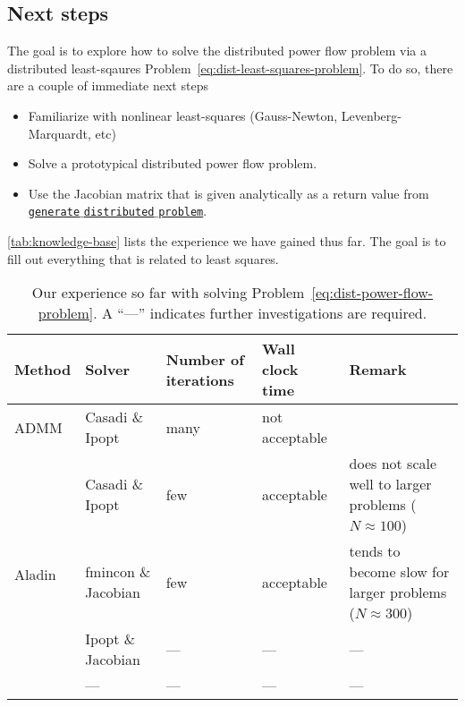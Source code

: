 \documentclass{article}
\begin{document}
\subsection{Next steps}

The goal is to explore how to solve the distributed power flow problem via a distributed least-sqaures Problem~\ref{eq:dist-least-squares-problem}.
To do so, there are a couple of immediate next steps
\begin{itemize}
    \item Familiarize with nonlinear least-squares (Gauss-Newton, Levenberg-Marquardt, etc)
    \item Solve a prototypical distributed power flow problem.
    \item Use the Jacobian matrix that is given analytically as a return value from \href{https://iai-vcs.iai.kit.edu/advancedcontrol/code/morenet/morenet/-/blob/master/03_parser/generate_distributed_problem.m}{\texttt{generate$\_$distributed$\_$problem}}.
\end{itemize}
\autoref{tab:knowledge-base} lists the experience we have gained thus far.
The goal is to fill out everything that is related to least squares.

\begin{table}
    \centering
    \caption{Our experience so far with solving Problem~\ref{eq:dist-power-flow-problem}. A ``---'' indicates further investigations are required.\label{tab:knowledge-base}}
    \begin{tabular}{llllp{4cm}}
        \toprule
        Method & Solver & Number of iterations & Wall clock time & Remark\\
        \midrule
        ADMM & Casadi \& Ipopt & many & not acceptable\\
        \midrule
        \multirow{5}{*}{Aladin} & Casadi \& Ipopt & few & acceptable & does not scale well to larger problems ($N \approx 100$)\\
         & fmincon \& Jacobian & few & acceptable & tends to become slow for larger problems ($N \approx 300$)\\
         & Ipopt \& Jacobian & --- & --- & ---\\
         \midrule
        Least squares & --- & --- & --- & ---\\
        \bottomrule
    \end{tabular}
\end{table}
\end{document}
